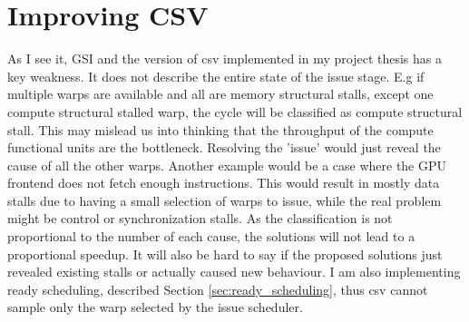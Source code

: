 \section{Improving CSV} \label{sec:improve_csv}

\noindent
As I see it, GSI and the version of \acrshort{csv} implemented in my project thesis has a key weakness. It does not describe the entire state of the issue stage. E.g if multiple warps are available and all are memory structural stalls, except one compute structural stalled warp, the cycle will be classified as compute structural stall. This may mislead us into thinking that the throughput of the compute functional units are the bottleneck. Resolving the 'issue' would just reveal the cause of all the other warps. Another example would be a case where the GPU frontend does not fetch enough instructions. This would result in mostly data stalls due to having a small selection of warps to issue, while the real problem might be control or synchronization stalls. As the classification is not proportional to the number of each cause, the solutions will not lead to a proportional speedup. It will also be hard to say if the proposed solutions just revealed existing stalls or actually caused new behaviour. I am also implementing ready scheduling, described Section \ref{sec:ready_scheduling}, thus \acrshort{csv} cannot sample only the warp selected by the issue scheduler.


